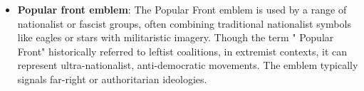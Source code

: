\begin{itemize}
  incorporates stylized nationalist imagery, including swords or eagles, designed to evoke Polish strength and
  purity. It is associated with extremist rhetoric and far-right political activism in Poland.
  \item \textbf{Popular front emblem}: The Popular Front emblem is used by a range of nationalist or fascist groups,
  often combining traditional nationalist symbols like eagles or stars with militaristic imagery. Though the term "
  Popular Front" historically referred to leftist coalitions, in extremist contexts, it can represent
  ultra-nationalist, anti-democratic movements. The emblem typically signals far-right or authoritarian ideologies.
\end{itemize}